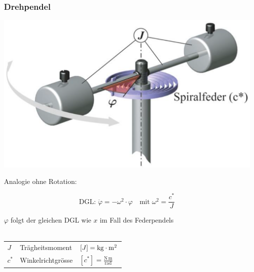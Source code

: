 \subsubsection{Drehpendel}

\begin{minipage}{0.4\linewidth}
\includegraphics[width=0.9\linewidth]{Bilder/Wellen-Optik/drehpendel}
\end{minipage}
\hfill
\begin{minipage}{0.56\linewidth}

Analogie ohne Rotation: 
\\




$$ \boxed{ \text{DGL: } \ddot{\varphi} = - \omega^2 \cdot\varphi \quad \text{mit } \omega^2 = \frac{c^*}{J}  }$$

$\varphi$ folgt der gleichen DGL wie $x$ im Fall des Federpendels \\

 \\
\end{minipage}

\vspace{0.2cm}


\begin{tabular}{lll}
$J$ & Trägheitsmoment & $[J] = \mathrm{kg} \cdot \mathrm{m}^2$ \\
\rule{0pt}{15pt}$c^*$ & Winkelrichtgrösse & $[c^*] = \mathrm{\frac{N \, m}{rad}}$ \\
\end{tabular}


